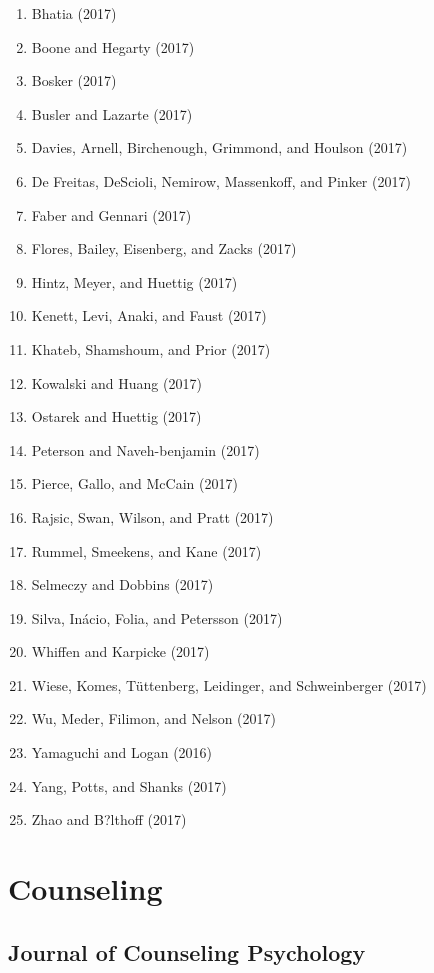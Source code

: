 \documentclass[english,man]{apa6}
\providecommand{\tightlist}{%
  \setlength{\itemsep}{0pt}\setlength{\parskip}{0pt}}
\theoremstyle{definition}
\theoremstyle{definition}
\theoremstyle{definition}
\theoremstyle{remark}
\begin{document}
\begin{enumerate}
\def\labelenumi{\arabic{enumi})}
\tightlist
\item
  Bhatia (2017)
\item
  Boone and Hegarty (2017)
\item
  Bosker (2017)
\item
  Busler and Lazarte (2017)
\item
  Davies, Arnell, Birchenough, Grimmond, and Houlson (2017)
\item
  De Freitas, DeScioli, Nemirow, Massenkoff, and Pinker (2017)
\item
  Faber and Gennari (2017)
\item
  Flores, Bailey, Eisenberg, and Zacks (2017)
\item
  Hintz, Meyer, and Huettig (2017)
\item
  Kenett, Levi, Anaki, and Faust (2017)
\item
  Khateb, Shamshoum, and Prior (2017)
\item
  Kowalski and Huang (2017)
\item
  Ostarek and Huettig (2017)
\item
  Peterson and Naveh-benjamin (2017)
\item
  Pierce, Gallo, and McCain (2017)
\item
  Rajsic, Swan, Wilson, and Pratt (2017)
\item
  Rummel, Smeekens, and Kane (2017)
\item
  Selmeczy and Dobbins (2017)
\item
  Silva, Inácio, Folia, and Petersson (2017)
\item
  Whiffen and Karpicke (2017)
\item
  Wiese, Komes, Tüttenberg, Leidinger, and Schweinberger (2017)
\item
  Wu, Meder, Filimon, and Nelson (2017)
\item
  Yamaguchi and Logan (2016)
\item
  Yang, Potts, and Shanks (2017)
\item
  Zhao and B?lthoff (2017)
\end{enumerate}

\section{Counseling}\label{counseling}

\subsection{Journal of Counseling
Psychology}\label{journal-of-counseling-psychology}
\end{document}
